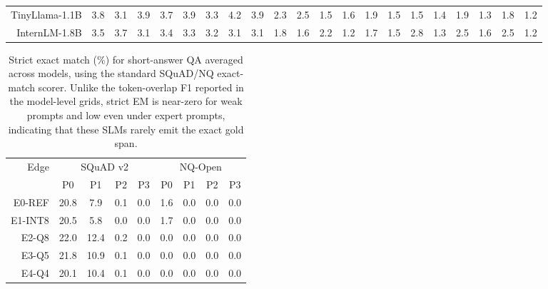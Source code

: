 \documentclass[letterpaper]{article}
\begin{document}
\begin{table}[t]
{\begin{tabular}{rrrrr|rrrr|rrrr|rrrr|rrrr}
TinyLlama-1.1B & \cellcolor[HTML]{FAD9CC}3.8 & \cellcolor[HTML]{FAD6CC}3.1 & \cellcolor[HTML]{FAD9CC}3.9 & \cellcolor[HTML]{FAD8CC}3.7 & \cellcolor[HTML]{FAD9CC}3.9 & \cellcolor[HTML]{FAD6CC}3.3 & \cellcolor[HTML]{FBDACC}4.2 & \cellcolor[HTML]{FAD9CC}3.9 & \cellcolor[HTML]{FBDBCC}2.3 & \cellcolor[HTML]{FBDCCC}2.5 & \cellcolor[HTML]{F9D3CC}1.5 & \cellcolor[HTML]{F9D4CC}1.6 & \cellcolor[HTML]{FAD8CC}1.9 & \cellcolor[HTML]{FAD5CC}1.5 & \cellcolor[HTML]{FAD5CC}1.5 & \cellcolor[HTML]{FAD4CC}1.4 & \cellcolor[HTML]{FAD8CC}1.9 & \cellcolor[HTML]{F9D4CC}1.3 & \cellcolor[HTML]{FAD8CC}1.8 & \cellcolor[HTML]{F9D3CC}1.2 \\
InternLM-1.8B & \cellcolor[HTML]{FAD7CC}3.5 & \cellcolor[HTML]{FAD8CC}3.7 & \cellcolor[HTML]{FAD6CC}3.1 & \cellcolor[HTML]{FAD7CC}3.4 & \cellcolor[HTML]{FAD6CC}3.3 & \cellcolor[HTML]{FAD6CC}3.2 & \cellcolor[HTML]{FAD5CC}3.1 & \cellcolor[HTML]{FAD5CC}3.1 & \cellcolor[HTML]{FAD6CC}1.8 & \cellcolor[HTML]{FAD4CC}1.6 & \cellcolor[HTML]{FAD9CC}2.2 & \cellcolor[HTML]{F9D0CC}1.2 & \cellcolor[HTML]{FAD6CC}1.7 & \cellcolor[HTML]{FAD5CC}1.5 & \cellcolor[HTML]{FBDECC}2.8 & \cellcolor[HTML]{F9D4CC}1.3 & \cellcolor[HTML]{FBDDCC}2.5 & \cellcolor[HTML]{FAD6CC}1.6 & \cellcolor[HTML]{FBDDCC}2.5 & \cellcolor[HTML]{F9D3CC}1.2 \\
\bottomrule
\end{tabular}%
}
\end{table}

\begin{table}[t]
\centering
\caption{Strict exact match (\%) for short-answer QA averaged across models,
using the standard SQuAD/NQ exact-match scorer. Unlike the token-overlap F1
reported in the model-level grids, strict EM is near-zero for weak prompts and
low even under expert prompts, indicating that these SLMs rarely emit the exact
gold span.}
\label{tab:short-answer-true-em}
\setlength{\tabcolsep}{2.4pt}
\renewcommand{\arraystretch}{0.92}
\begin{tabular}{rcccc|cccc}
\toprule
Edge & \multicolumn{4}{c}{SQuAD v2} & \multicolumn{4}{c}{NQ-Open} \\
\cmidrule(lr){2-5} \cmidrule(lr){6-9}
 & P0 & P1 & P2 & P3 & P0 & P1 & P2 & P3 \\
\midrule
E0-REF  & 20.8 & 7.9 & 0.1 & 0.0 & 1.6 & 0.0 & 0.0 & 0.0 \\
E1-INT8 & 20.5 & 5.8 & 0.0 & 0.0 & 1.7 & 0.0 & 0.0 & 0.0 \\
E2-Q8   & 22.0 & 12.4 & 0.2 & 0.0 & 0.0 & 0.0 & 0.0 & 0.0 \\
E3-Q5   & 21.8 & 10.9 & 0.1 & 0.0 & 0.0 & 0.0 & 0.0 & 0.0 \\
E4-Q4   & 20.1 & 10.4 & 0.1 & 0.0 & 0.0 & 0.0 & 0.0 & 0.0 \\
\bottomrule
\end{tabular}
\end{table}
\end{document}
